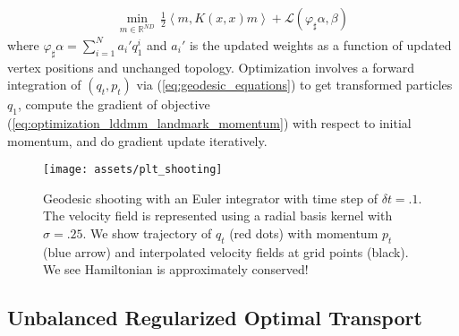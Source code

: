 \documentclass{6838publ}
\newcommand\sL{\ensuremath{\mathcal{L}}}
\newcommand\R{\ensuremath{\mathbb{R}}} %
\newcommand\inner[2]{\ensuremath{\left< #1, #2 \right>}} %
\begin{document}
\begin{align}
    \min_{m\in\R^{ND}} \,
        \frac{1}{2} \inner{ m }{ K(x,x) m } + \sL(\varphi_\sharp \alpha, \beta)
    \label{eq:optimization_lddmm_landmark_momentum}
\end{align}
where $\varphi_\sharp\alpha = \sum_{i=1}^N a_i' q_1^i$ and $a_i'$ is the updated weights as a function of updated vertex positions and unchanged topology. Optimization involves a forward integration of $(q_t,p_t)$ via (\ref{eq:geodesic_equations}) to get transformed particles $q_1$, compute the gradient of objective (\ref{eq:optimization_lddmm_landmark_momentum}) with respect to initial momentum, and do gradient update iteratively. 


\begin{center} 
\begin{figure}[t]
    \texttt{[image: assets/plt\_shooting]} 
    \caption{Geodesic shooting with an Euler integrator with time step of $\delta t = .1$. The velocity field is represented using a radial basis kernel with $\sigma=.25$. We show trajectory of $q_t$ (red dots) with momentum $p_t$ (blue arrow) and interpolated velocity fields at grid points (black). We see Hamiltonian is approximately conserved!}
    \label{fig:plt_shooting}
\end{figure} 
\end{center}


\subsection{Unbalanced Regularized Optimal Transport}
\end{document}

